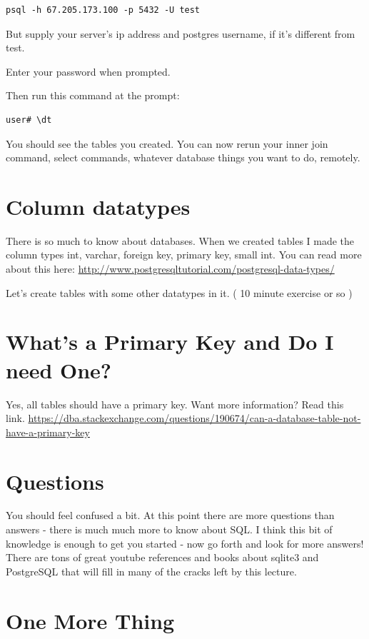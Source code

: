 \documentclass[12pt,a4paper]{article}
\begin{document}
\begin{verbatim}
psql -h 67.205.173.100 -p 5432 -U test
\end{verbatim}

But supply your server's ip address and postgres username, if it's different
from test.

Enter your password when prompted.

Then run this command at the prompt:

\begin{verbatim}
user# \dt
\end{verbatim}

You should see the tables you created. You can now rerun your inner join command, select commands, whatever database things you want to do, remotely.

\section{Column datatypes}
There is so much to know about databases. When we created tables I made the column types int, varchar, foreign key, primary key, small int. You can read more about this here:
\url{http://www.postgresqltutorial.com/postgresql-data-types/}

Let's create tables with some other datatypes in it. ( 10 minute exercise or so )

\section{ What's a Primary Key and Do I need One?}
Yes, all tables should have a primary key. Want more information? Read this
link.
\url{https://dba.stackexchange.com/questions/190674/can-a-database-table-not-have-a-primary-key}

\section{ Questions }
You should feel confused a bit. At this point there are more questions than
answers - there is much much more to know about SQL. I think  this bit of
knowledge is enough to get you started - now go forth and look  for more
answers! There are tons of great youtube references and books about sqlite3 and
PostgreSQL that will fill in many of the cracks left by this lecture.

\section{One More Thing}
\end{document}
